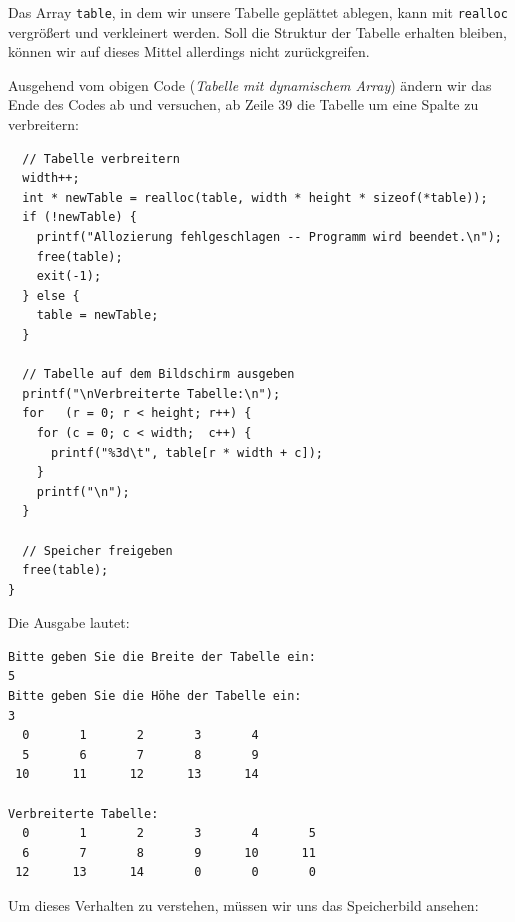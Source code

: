 Das Array \texttt{table}, in dem wir unsere Tabelle geplättet ablegen, kann mit \texttt{realloc} vergrößert und verkleinert werden. Soll die Struktur der Tabelle erhalten bleiben, können wir auf dieses Mittel allerdings nicht zurückgreifen.

Ausgehend vom obigen Code (\emph{Tabelle mit dynamischem Array}) ändern wir das Ende des Codes ab und versuchen, ab Zeile 39 die Tabelle um eine Spalte zu verbreitern:

\begin{warnbox}[Beispiel: Tabelle vergrößern mit dynamischem Array -- (fehlerhafter Code),leftupper=7mm]
\begin{verbatim}
  // Tabelle verbreitern
  width++;
  int * newTable = realloc(table, width * height * sizeof(*table));
  if (!newTable) {
    printf("Allozierung fehlgeschlagen -- Programm wird beendet.\n");
    free(table);
    exit(-1);
  } else {
    table = newTable;
  }
  
  // Tabelle auf dem Bildschirm ausgeben
  printf("\nVerbreiterte Tabelle:\n");
  for   (r = 0; r < height; r++) {
    for (c = 0; c < width;  c++) {
      printf("%3d\t", table[r * width + c]);
    }
    printf("\n");
  }
  
  // Speicher freigeben
  free(table);
}
\end{verbatim}
\end{warnbox}

Die Ausgabe lautet:

\begin{cmdbox}
\begin{verbatim}
Bitte geben Sie die Breite der Tabelle ein:
5
Bitte geben Sie die Höhe der Tabelle ein:
3
  0       1       2       3       4
  5       6       7       8       9
 10      11      12      13      14

Verbreiterte Tabelle:
  0       1       2       3       4       5
  6       7       8       9      10      11
 12      13      14       0       0       0

\end{verbatim}
\end{cmdbox}

Um dieses Verhalten zu verstehen, müssen wir uns das Speicherbild ansehen:

